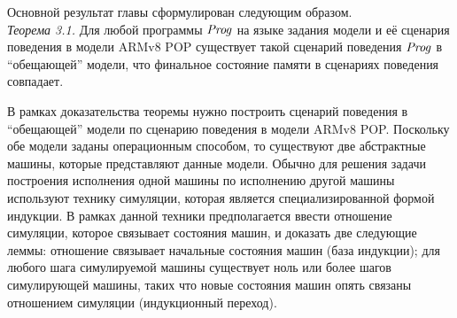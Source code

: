 Основной результат главы %
сформулирован следующим образом. \\
\emph{Теорема 3.1.} Для любой программы $\mathit{Prog}$ на языке задания модели и её сценария поведения в модели ARMv8 POP существует
такой сценарий поведения $\mathit{Prog}$ в ``обещающей'' модели, что финальное состояние памяти в сценариях поведения совпадает.

В рамках доказательства теоремы нужно построить сценарий поведения в ``обещающей'' модели по сценарию поведения в модели ARMv8 POP.
Поскольку обе модели заданы операционным способом, то существуют две абстрактные машины, которые представляют данные модели.
Обычно для решения задачи построения исполнения одной машины по исполнению другой машины используют технику симуляции,
которая является специализированной формой индукции. В рамках данной техники предполагается ввести  отношение симуляции,
которое связывает состояния машин, и доказать  две следующие леммы:  отношение связывает начальные состояния машин (база индукции);
для любого шага симулируемой машины существует ноль или более шагов симулирующей машины, таких что
новые состояния машин опять связаны отношением симуляции (индукционный переход).




